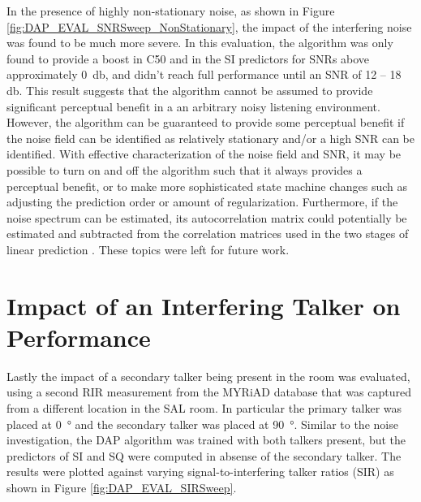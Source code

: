 In the presence of highly non-stationary noise, as shown in Figure \ref{fig:DAP_EVAL_SNRSweep_NonStationary}, the impact of the interfering noise was found to be much more severe. In this evaluation, the algorithm was only found to provide a boost in C50 and in the SI predictors for SNRs above approximately \qty{0}{\decibel}, and didn't reach full performance until an SNR of 12 -- 18 \unit{\decibel}. This result suggests that the algorithm cannot be assumed to provide significant perceptual benefit in a an arbitrary noisy listening environment. However, the algorithm can be guaranteed to provide some perceptual benefit if the noise field can be identified as relatively stationary and/or a high SNR can be identified. With effective characterization of the noise field and SNR, it may be possible to turn on and off the algorithm such that it always provides a perceptual benefit, or to make more sophisticated state machine changes such as adjusting the prediction order or amount of regularization. Furthermore, if the noise spectrum can be estimated, its autocorrelation matrix could potentially be estimated and subtracted from the correlation matrices used in the two stages of linear prediction \citep[e.g., as described by][]{triki2008robust}. These topics were left for future work.

\section{Impact of an Interfering Talker on Performance}

Lastly the impact of a secondary talker being present in the room was evaluated, using a second RIR measurement from the MYRiAD database that was captured from a different location in the SAL room. In particular the primary talker was placed at \qty{0}{\degree} and the secondary talker was placed at \qty{90}{\degree}. Similar to the noise investigation, the DAP algorithm was trained with both talkers present, but the predictors of SI and SQ were computed in absense of the secondary talker. The results were plotted against varying signal-to-interfering talker ratios (SIR) as shown in Figure \ref{fig:DAP_EVAL_SIRSweep}.


